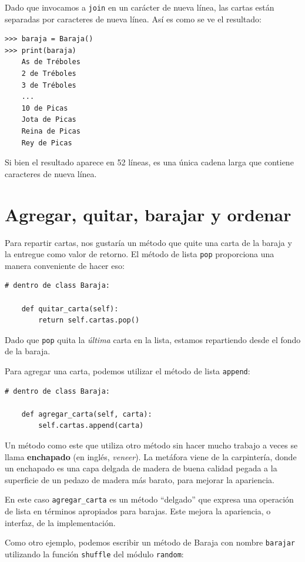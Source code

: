 \documentclass[10pt]{book}
\begin{document}
Dado que invocamos a {\tt join} en un carácter de nueva línea, las cartas
están separadas por caracteres de nueva línea.  Así es como se ve el resultado:

\begin{verbatim}
>>> baraja = Baraja()
>>> print(baraja)
    As de Tréboles
    2 de Tréboles
    3 de Tréboles
    ...
    10 de Picas
    Jota de Picas
    Reina de Picas
    Rey de Picas
\end{verbatim}
%
Si bien el resultado aparece en 52 líneas, es una única
cadena larga que contiene caracteres de nueva línea.


\section{Agregar, quitar, barajar y ordenar}

Para repartir cartas, nos gustaría un método que
quite una carta de la baraja y la entregue como valor de retorno.
El método de lista {\tt pop} proporciona una manera conveniente de hacer eso:

\begin{verbatim}
# dentro de class Baraja:

    def quitar_carta(self):
        return self.cartas.pop()
\end{verbatim}
%
Dado que {\tt pop} quita la {\em última} carta en la lista, estamos
repartiendo desde el fondo de la baraja.

Para agregar una carta, podemos utilizar el método de lista {\tt append}:

\begin{verbatim}
# dentro de class Baraja:

    def agregar_carta(self, carta):
        self.cartas.append(carta)
\end{verbatim}
%
Un método como este que utiliza otro método sin hacer
mucho trabajo a veces se llama {\bf enchapado} (en inglés, {\em veneer}).  La metáfora
viene de la carpintería, donde un enchapado es una capa
delgada de madera de buena calidad pegada a la superficie de un pedazo de madera
más barato, para mejorar la apariencia.

En este caso \verb"agregar_carta" es un método ``delgado'' que expresa
una operación de lista en términos apropiados para barajas.  Este
mejora la apariencia, o interfaz, de la
implementación.

Como otro ejemplo, podemos escribir un método de Baraja con nombre {\tt barajar} 
utilizando la función {\tt shuffle} del módulo {\tt random}:
\end{document}
